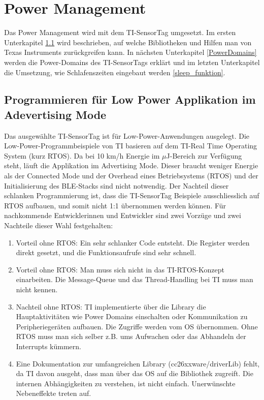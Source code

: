 \section{Power Management}
\label{powerOptimierung}

Das Power Management wird mit dem TI-SensorTag umgesetzt. Im ersten Unterkapitel \ref{keinROTS} wird beschrieben, auf welche Bibliotheken und Hilfen man von Texas Instruments zurückgreifen kann. In nächsten Unterkapitel \ref{PowerDomains} werden die Power-Domains des TI-SensorTags erklärt und im letzten Unterkapitel die Umsetzung, wie Schlafenszeiten eingebaut werden \ref{sleep_funktion}.


\subsection{Programmieren für Low Power Applikation im Adevertising Mode}
\label{keinROTS}

Das ausgewählte TI-SensorTag ist für Low-Power-Anwendungen ausgelegt. Die Low-Power-Programmbeispiele von TI basieren auf dem TI-Real Time Operating System (kurz RTOS). Da bei 10 km/h Energie im $\mu$J-Bereich zur Verfügung steht, läuft die Applikation im Advertising Mode. Dieser braucht weniger Energie als der Connected Mode und der Overhead eines Betriebsystems (RTOS) und der Initialisierung des BLE-Stacks sind nicht notwendig. Der Nachteil dieser schlanken Programmierung ist, dass die TI-SensorTag Beispiele ausschliesslich auf RTOS aufbauen, und somit nicht 1:1 übernommen werden können. Für nachkommende Entwicklerinnen und Entwickler sind zwei Vorzüge und zwei Nachteile dieser Wahl festgehalten:

\begin{minipage}{1\textwidth}
    \begin{enumerate}
        \item Vorteil ohne RTOS: Ein sehr schlanker Code entsteht. Die Register werden direkt gesetzt, und die Funktionsaufrufe sind sehr schnell.
        \item Vorteil ohne RTOS: Man muss sich nicht in das TI-RTOS-Konzept einarbeiten. Die Message-Queue und das Thread-Handling bei TI muss man nicht kennen.
        \item Nachteil ohne RTOS: TI implementierte über die Library die Hauptaktivitäten wie Power Domains einschalten oder Kommunikation zu Peripheriegeräten aufbauen. Die Zugriffe werden vom OS übernommen. Ohne RTOS muss man sich selber z.B. ums Aufwachen oder das Abhandeln der Interrupts kümmern.        
       \item Eine Dokumentation zur umfangreichen Library (cc26xxware/driverLib) fehlt, da TI davon ausgeht, dass man über das OS auf die Bibliothek zugreift. Die internen Abhängigkeiten zu verstehen, ist nicht einfach. Unerwünschte Nebeneffekte treten auf.
    \end{enumerate}
\end{minipage}


